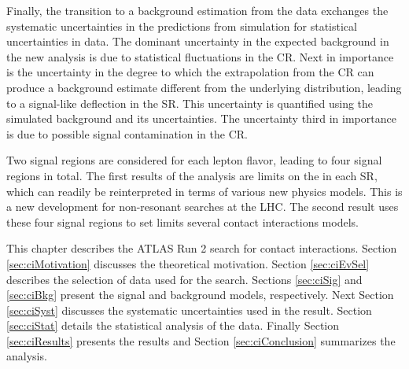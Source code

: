 Finally, the transition to a background estimation from the data exchanges the systematic uncertainties in the predictions from simulation for statistical uncertainties in data.
The dominant uncertainty in the expected background in the new analysis is due to statistical fluctuations in the CR.
Next in importance is the uncertainty in the degree to which the extrapolation from the CR can produce a background estimate different from the underlying distribution, leading to a signal-like deflection in the SR. This uncertainty is quantified using the simulated background and its uncertainties.
The uncertainty third in importance is due to possible signal contamination in the CR.

Two signal regions are considered for each lepton flavor, leading to four signal regions in total.
The first results of the analysis are limits on the \xsbr in each SR, which can readily be reinterpreted in terms of various new physics models.
This is a new development for non-resonant searches at the LHC.
The second result uses these four signal regions to set limits several contact interactions models.

This chapter describes the ATLAS Run 2 search for contact interactions.
Section \ref{sec:ciMotivation} discusses the theoretical motivation.
Section \ref{sec:ciEvSel} describes the selection of data used for the search.
Sections \ref{sec:ciSig} and \ref{sec:ciBkg} present the signal and background models, respectively.
Next Section \ref{sec:ciSyst} discusses the systematic uncertainties used in the result.
Section \ref{sec:ciStat} details the statistical analysis of the data.
Finally Section \ref{sec:ciResults} presents the results and Section \ref{sec:ciConclusion} summarizes the analysis.











